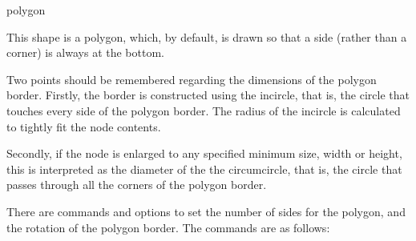 %
%
%
%

\begin{shape}{polygon}

	This shape is a polygon, which, by default, is drawn so that a side
	(rather than a corner) is always at the bottom. 

\begin{codeexample}[]
\end{codeexample}
	
	Two points should be remembered regarding the dimensions of the
	polygon border.
	Firstly,	the border is constructed using the incircle, that is, the
	circle that touches every side of the polygon border. The radius of
	the incircle is calculated to tightly fit the node contents.

\begin{codeexample}[]
\end{codeexample}	
	
	Secondly, if the node is enlarged to any specified minimum size, 
	width or height, this is interpreted as the diameter of the the 
	circumcircle, that is, the circle that	passes through all the 
	corners of the polygon border.

\begin{codeexample}[]
\end{codeexample}	

	There are \pgfname{} commands and \tikzname{} options to set the 
	number of sides for the polygon, and the rotation of the polygon 
	border. The \pgfname{} commands are as follows:
	

\end{shape}
